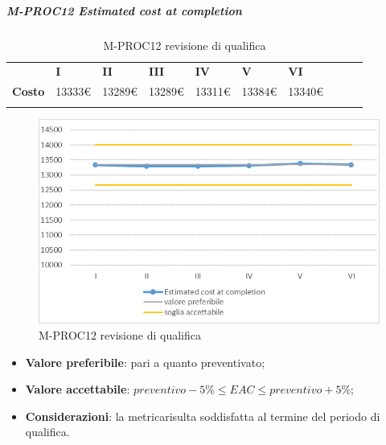 \subparagraph{M-PROC12 Estimated cost at completion} \mbox{}
\begin{longtable}[H!] {						
		>{}p{35mm}  		
		>{}p{12mm}
		>{}p{12mm}		
		>{}p{12mm}		
		>{}p{12mm}		
		>{}p{12mm}		
		>{}p{12mm}
		>{}p{12mm}
		>{}p{12mm}
		>{}p{12mm}
	}
	\rowcolor{gray!50}
	\textbf{} & \textbf{I} & \textbf{II} & \textbf{III} & \textbf{IV} & \textbf{V} & \textbf{VI} \TBstrut \\ [2mm]
	\textbf{Costo} & 13333\euro & 13289\euro & 13289\euro & 13311\euro & 13384\euro & 13340\euro \TBstrut \\ [2mm]
	\rowcolor{white}
	\caption{M-PROC12 revisione di qualifica}
\end{longtable}
\begin{figure}[H] 	
	\includegraphics[width=\linewidth]{./img/grafici/RQ12.png}	
	\caption{M-PROC12 revisione di qualifica}	
\end{figure}
\begin{itemize}
	\item \textbf{Valore preferibile}: pari a quanto preventivato;
	\item \textbf{Valore accettabile}: $preventivo-5\% \le EAC \le preventivo+5\%$;
	\item \textbf{Considerazioni}: la metrica\glosp risulta soddisfatta al termine del periodo di qualifica.
\end{itemize}


